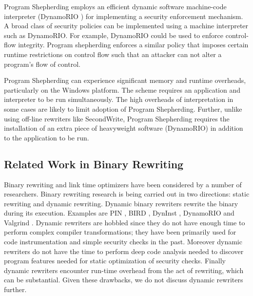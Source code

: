 
 Program Shepherding \cite{shepherd}
employs an efficient dynamic software machine-code interpreter
(DynamoRIO \cite{drio}) for implementing a security enforcement
mechanism. A broad class of security policies can be implemented using
a machine interpreter such as DynamoRIO. For example, DynamoRIO could
be used to enforce control-flow integrity. Program shepherding
enforces a similar policy that imposes certain runtime restrictions on
control flow such that an attacker can not alter a program's flow of
control.

Program Shepherding can experience significant memory and runtime
overheads, particularly on the Windows platform. The scheme requires
an application and interpreter to be run simultaneously. The high
overheads of interpretation in some cases are likely to limit adoption
of Program Shepherding. Further, unlike using off-line rewriters like SecondWrite, Program Shepherding requires the installation of an extra piece of heavyweight software (DynamoRIO) in addition to the application to be run.

\subsection{Related Work in Binary Rewriting}

Binary rewriting and link time optimizers have been considered by a
number of researchers. Binary rewriting research is being carried out
in two directions: static rewriting and dynamic rewriting. Dynamic
binary rewriters rewrite the binary during its execution. Examples are
PIN \cite{pin}, BIRD \cite{bird}, DynInst \cite{dyninst}, DynamoRIO
\cite{drio} and Valgrind \cite{valg}. Dynamic rewriters are hobbled
since they do not have enough time to perform complex compiler
transformations; they have been primarily used for code
instrumentation and simple security checks in the past. Moreover
dynamic rewriters do not have the time to perform deep code analysis
needed to discover program features needed for static optimization of
security checks. Finally dynamic rewriters encounter run-time overhead
from the act of rewriting, which can be substantial. Given these
drawbacks, we do not discuss dynamic rewriters further.

